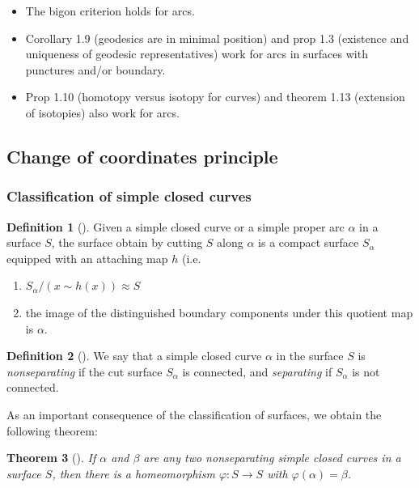 \documentclass[reqno]{amsart}
\newtheorem{theorem}{Theorem}[section]
\theoremstyle{definition}
\newtheorem{definition}[theorem]{Definition}
\theoremstyle{remark}
\begin{document}
\begin{itemize}
    \item The bigon criterion holds for arcs.
    \item Corollary 1.9 (geodesics are in minimal position)
        and prop 1.3 (existence and uniqueness of geodesic 
        representatives) work for arcs in surfaces with
        punctures and/or boundary.
    \item Prop 1.10 (homotopy versus isotopy for curves) and
        theorem 1.13 (extension of isotopies) also
        work for arcs.
\end{itemize}

\subsection*{Change of coordinates principle}

\subsubsection*{Classification of simple closed curves}

\begin{definition}[]
    Given a simple closed curve or
    a simple proper arc $\alpha$ in a surface $S$,
    the surface obtain by cutting $S$ along $\alpha$ is
    a compact surface $S_{\alpha}$ equipped with an attaching
    map $h$ (i.e.
    \begin{enumerate}
        \item $S_{\alpha} / \left( x \sim h(x) \right) 
            \approx S$ 
        \item the image of the distinguished boundary components
            under this quotient map is $\alpha$.
    \end{enumerate}
\end{definition}

\begin{definition}[]
    We say that a simple closed curve $\alpha$ in the surface
    $S$ is \textit{nonseparating} if the cut surface
    $S_{\alpha}$ is connected, and \textit{separating} if
    $S_{\alpha}$ is not connected.
\end{definition}


As an important consequence of the classification of surfaces, we
obtain the following theorem:

\begin{theorem}[]
    If $\alpha$ and $\beta$ are any two nonseparating simple
    closed curves in a surface $S$, then there
    is a homeomorphism $\varphi \colon S \to S$ with
    $\varphi \left( \alpha \right) = \beta$.
\end{theorem}
\end{document}

